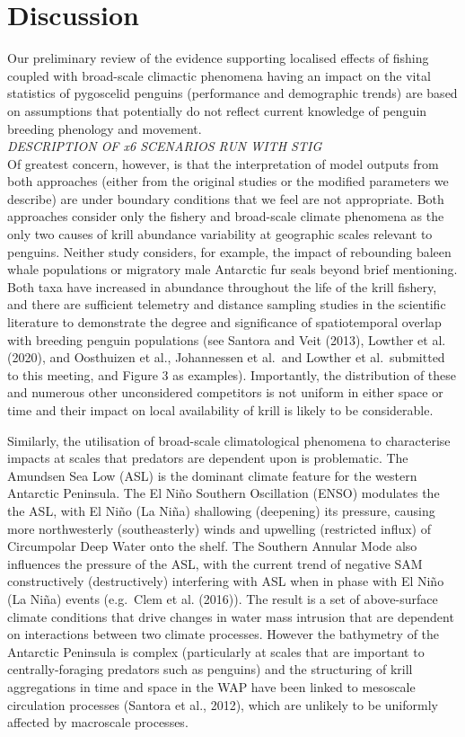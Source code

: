 \documentclass[]{elsarticle} %
\begin{document}
\hypertarget{discussion}{%
\section{Discussion}\label{discussion}}

Our preliminary review of the evidence supporting localised effects of
fishing coupled with broad-scale climactic phenomena having an impact on
the vital statistics of pygoscelid penguins (performance and demographic
trends) are based on assumptions that potentially do not reflect current
knowledge of penguin breeding phenology and movement.\\
\newline \emph{DESCRIPTION OF x6 SCENARIOS RUN WITH STIG}\\
\newline   Of greatest concern, however, is that the interpretation of
model outputs from both approaches (either from the original studies or
the modified parameters we describe) are under boundary conditions that
we feel are not appropriate. Both approaches consider only the fishery
and broad-scale climate phenomena as the only two causes of krill
abundance variability at geographic scales relevant to penguins. Neither
study considers, for example, the impact of rebounding baleen whale
populations or migratory male Antarctic fur seals beyond brief
mentioning. Both taxa have increased in abundance throughout the life of
the krill fishery, and there are sufficient telemetry and distance
sampling studies in the scientific literature to demonstrate the degree
and significance of spatiotemporal overlap with breeding penguin
populations (see Santora and Veit (2013), Lowther et al. (2020), and
Oosthuizen et al., Johannessen et al.~and Lowther et al.~submitted to
this meeting, and Figure 3 as examples). Importantly, the distribution
of these and numerous other unconsidered competitors is not uniform in
either space or time and their impact on local availability of krill is
likely to be considerable.

Similarly, the utilisation of broad-scale climatological phenomena to
characterise impacts at scales that predators are dependent upon is
problematic. The Amundsen Sea Low (ASL) is the dominant climate feature
for the western Antarctic Peninsula. The El Niño Southern Oscillation
(ENSO) modulates the the ASL, with El Niño (La Niña) shallowing
(deepening) its pressure, causing more northwesterly (southeasterly)
winds and upwelling (restricted influx) of Circumpolar Deep Water onto
the shelf. The Southern Annular Mode also influences the pressure of the
ASL, with the current trend of negative SAM constructively
(destructively) interfering with ASL when in phase with El Niño (La
Niña) events (e.g.~Clem et al. (2016)). The result is a set of
above-surface climate conditions that drive changes in water mass
intrusion that are dependent on interactions between two climate
processes. However the bathymetry of the Antarctic Peninsula is complex
(particularly at scales that are important to centrally-foraging
predators such as penguins) and the structuring of krill aggregations in
time and space in the WAP have been linked to mesoscale circulation
processes (Santora et al., 2012), which are unlikely to be uniformly
affected by macroscale processes.
\end{document}
